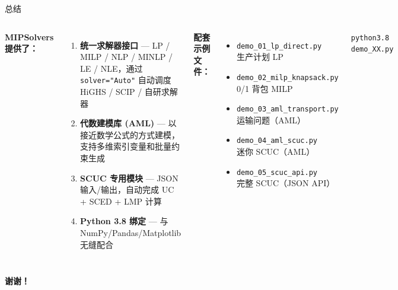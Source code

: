 \documentclass[10pt,aspectratio=169]{beamer}
\begin{document}
\begin{frame}{总结}
  \begin{columns}[T]
    \textbf{MIPSolvers 提供了：}
    \begin{enumerate}
      \item \textbf{统一求解器接口} — LP / MILP / NLP / MINLP / LE / NLE，通过 \texttt{solver="Auto"} 自动调度 HiGHS / SCIP / 自研求解器
      \item \textbf{代数建模库 (AML)} — 以接近数学公式的方式建模，支持多维索引变量和批量约束生成
      \item \textbf{SCUC 专用模块} — JSON 输入/输出，自动完成 UC + SCED + LMP 计算
      \item \textbf{Python 3.8 绑定} — 与 NumPy/Pandas/Matplotlib 无缝配合
    \end{enumerate}

    \textbf{配套示例文件：}
    \begin{itemize}
      \footnotesize
      \item \texttt{demo\_01\_lp\_direct.py}\\生产计划 LP
      \item \texttt{demo\_02\_milp\_knapsack.py}\\0/1 背包 MILP
      \item \texttt{demo\_03\_aml\_transport.py}\\运输问题（AML）
      \item \texttt{demo\_04\_aml\_scuc.py}\\迷你 SCUC（AML）
      \item \texttt{demo\_05\_scuc\_api.py}\\完整 SCUC（JSON API）
    \end{itemize}

    \vspace{8pt}
    \begin{tcolorbox}[mybox,title=运行方式]
      \footnotesize
      \texttt{python3.8 demo\_XX.py}
    \end{tcolorbox}
  \end{columns}

  \vspace{16pt}
  \begin{center}
    \large\textbf{谢谢！}
  \end{center}
\end{frame}

\appendix
\end{document}
